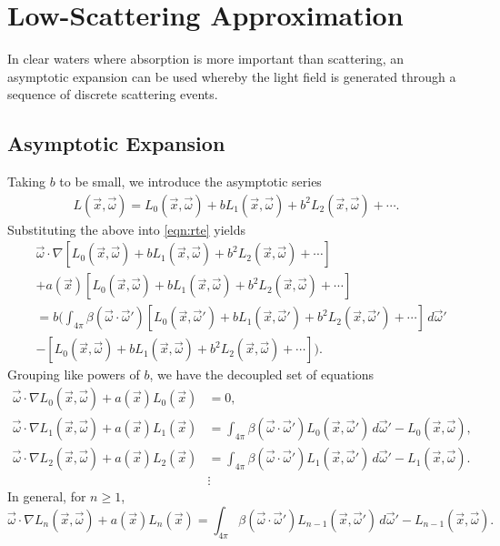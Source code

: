 \section{Low-Scattering Approximation}
In clear waters where absorption is more important than scattering, an asymptotic expansion can be used whereby the light field is generated through a sequence of discrete scattering events.
\subsection{Asymptotic Expansion}
Taking $b$ to be small, we introduce the asymptotic series
\newcommand{\Lasym}{L_0(\vec{x},\vec{\omega}) + b L_1(\vec{x},\vec{\omega}) + b^2 L_2(\vec{x},\vec{\omega}) + \cdots}
\newcommand{\Lasyms}{L_0(\vec{x_s},\vec{\omega}) + b L_1(\vec{x_s},\vec{\omega}) + b^2 L_2(\vec{x_s},\vec{\omega}) + \cdots}
\newcommand{\Lasymp}{L_0(\vec{x},\vec{\omega}') + b L_1(\vec{x},\vec{\omega}') + b^2 L_2(\vec{x},\vec{\omega}') + \cdots}
\begin{align*}
  L(\vec{x},\vec{\omega}) = \Lasym.
\end{align*}
Substituting the above into \eqref{eqn:rte} yields
\begin{align*}
    &\vec{\omega} \cdot \nabla \left[ \Lasym \right] \\
    &+ a(\vec{x}) \left[ \Lasym \right] \\
    &= b\Bigg(
      \int_{4\pi} \beta(\vec{\omega}\cdot\vec{\omega}')
      \left[ \Lasymp \right] \, d\vec{\omega}' \\
    &- \left[ \Lasym \right]
    \Bigg).
\end{align*}
Grouping like powers of $b$, we have the decoupled set of equations
\begin{align}
  \vec{\omega} \cdot \nabla L_0(\vec{x}, \vec{\omega}) + a(\vec{x})L_0(\vec{x}) &= 0,
  \label{eqn:asymptotics_0}\\
  \vec{\omega} \cdot \nabla L_1(\vec{x}, \vec{\omega}) + a(\vec{x})L_1(\vec{x})
  &= \int_{4\pi} \beta(\vec{\omega}\cdot\vec{\omega}') L_0(\vec{x}, \vec{\omega}')\,d\vec{\omega}' - L_0(\vec{x}, \vec{\omega}), \nonumber\\ 
  \vec{\omega} \cdot \nabla L_2(\vec{x}, \vec{\omega}) + a(\vec{x})L_2(\vec{x})
  &= \int_{4\pi} \beta(\vec{\omega}\cdot\vec{\omega}') L_1(\vec{x}, \vec{\omega}')\,d\vec{\omega}' - L_1(\vec{x}, \vec{\omega}). \nonumber \\ 
  &\vdots \nonumber
\end{align}
In general, for $n \geq 1$,
\begin{equation}
  \vec{\omega} \cdot \nabla L_n(\vec{x}, \vec{\omega}) + a(\vec{x})L_n(\vec{x})
  = \int_{4\pi} \beta(\vec{\omega}\cdot\vec{\omega}') L_{n-1}(\vec{x}, \vec{\omega}')\,d\vec{\omega}' - L_{n-1}(\vec{x}, \vec{\omega}).
  \label{eqn:asymptotics_n}
\end{equation}

